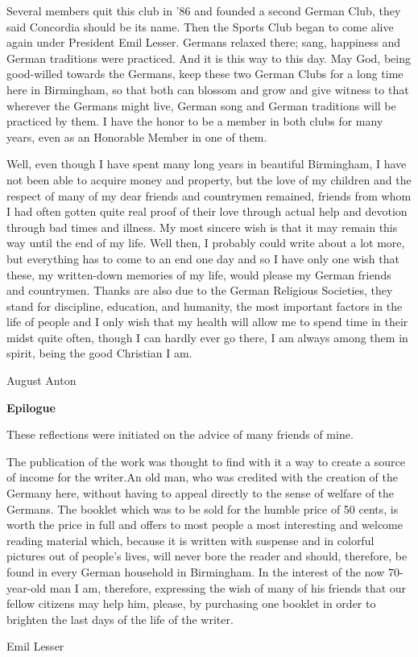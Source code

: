 Several members quit this club in '86 and founded a second German Club, they said Concordia should be its name. Then the Sports Club began to come alive again under President Emil Lesser. Germans relaxed there; sang, happiness and German traditions were practiced. And it is this way to this day. May God, being good-willed towards the Germans, keep these two German Clubs for a long time here in Birmingham, so that both can blossom and grow and give witness to that wherever the Germans might live, German song and German traditions will be practiced by them. I have the honor to be a member in both clubs for many years, even as an Honorable Member in one of them.

Well, even though I have spent many long years in beautiful Birmingham, I have not been able to acquire money and property, but the love of my children and the respect of many of my dear friends and countrymen remained, friends from whom I had often gotten quite real proof of their love through actual help and devotion through bad times and illness. My most sincere wish is that it may remain this way until the end of my life. Well then, I probably could write about a lot more, but everything has to come to an end one day and so I have only one wish that these, my written-down memories of my life, would please my German friends and countrymen. Thanks are also due to the German Religious Societies, they stand for discipline, education, and humanity, the most important factors in the life of people and I only wish that my health will allow me to spend time in their midst quite often, though I can hardly ever go there, I am always among them in spirit, being the good Christian I am.

August Anton

\textbf{Epilogue}

These reflections were initiated on the advice of many friends of mine.

The publication of the work was thought to find with it a way to create a source of income for the writer.An old man, who was credited with the creation of the Germany here, without having to appeal directly to the sense of welfare of the Germans. The booklet which was to be sold for the humble price of 50 cents, is worth the price in full and offers to most people a most interesting and welcome reading material which, because it is written with suspense and in colorful pictures out of people's lives, will never bore the reader and should, therefore, be found in every German household in Birmingham. In the interest of the now 70-year-old man I am, therefore, expressing the wish of many of his friends that our fellow citizens may help him, please, by purchasing one booklet in order to brighten the last days of the life of the writer.

Emil Lesser
